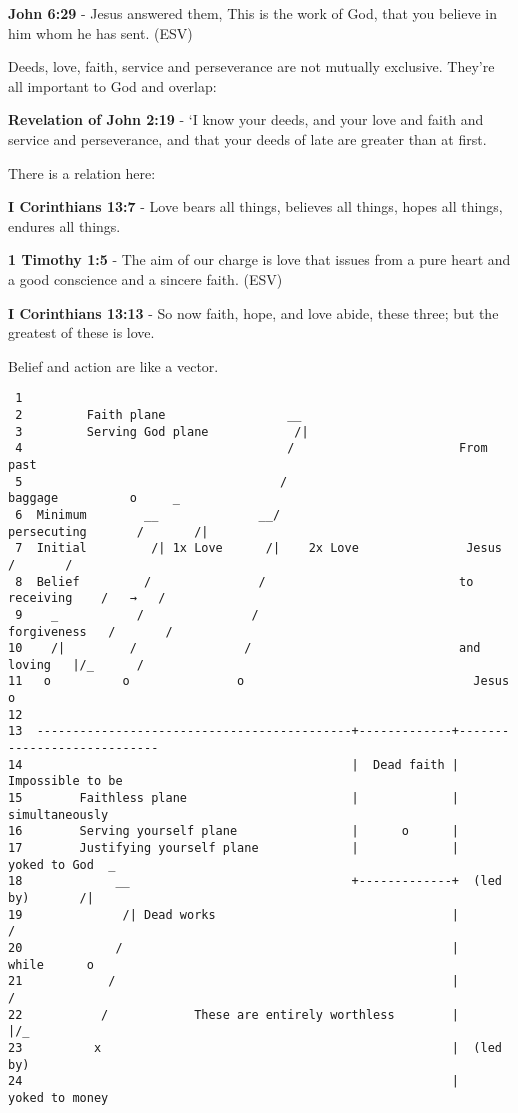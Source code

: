 \documentclass[11pt]{article}
\begin{document}
\textbf{John 6:29} - Jesus answered them, This is the work of God, that you believe in him whom he has sent. (ESV)

Deeds, love, faith, service and perseverance are not mutually exclusive. They're all important to God and overlap:

\textbf{Revelation of John 2:19} - ‘I know your deeds, and your love and faith and service and perseverance, and that your deeds of late are greater than at first.

There is a relation here:

\textbf{I Corinthians 13:7} - Love bears all things, believes all things, hopes all things, endures all things.

\textbf{1 Timothy 1:5} -  The aim of our charge is love that issues from a pure heart and a good conscience and a sincere faith.  (ESV)

\textbf{I Corinthians 13:13} - So now faith, hope, and love abide, these three; but the greatest of these is love.

Belief and action are like a vector.

\begin{verbatim}
 1  
 2         Faith plane                 __
 3         Serving God plane            /|
 4                                     /                       From past
 5                                    /                          baggage          o     _
 6  Minimum        __              __/                         persecuting       /       /|
 7  Initial         /| 1x Love      /|    2x Love               Jesus           /       /
 8  Belief         /               /                           to receiving    /   →   /
 9    _           /               /                             forgiveness   /       /
10    /|         /               /                             and loving   |/_      /
11   o          o               o                                Jesus              o
12  
13  --------------------------------------------+-------------+----------------------------
14                                              |  Dead faith |    Impossible to be
15        Faithless plane                       |             |     simultaneously
16        Serving yourself plane                |      o      |
17        Justifying yourself plane             |             |   yoked to God  _
18             __                               +-------------+  (led by)       /|
19              /| Dead works                                 |                /
20             /                                              |    while      o
21            /                                               |              /
22           /            These are entirely worthless        |            |/_
23          x                                                 |  (led by)
24                                                            |   yoked to money
\end{verbatim}
\end{document}
